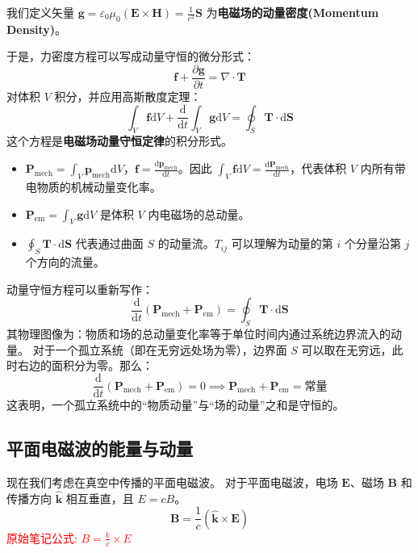 \documentclass[fontset=none]{ctexart}
\begin{document}
\begin{definition}[电磁场动量密度]
我们定义矢量 $\bm{g} = \varepsilon_0\mu_0(\bm{E} \times \bm{H}) = \frac{1}{c^2}\bm{S}$ 为\textbf{电磁场的动量密度(Momentum Density)}。
\end{definition}

于是，力密度方程可以写成动量守恒的微分形式：
\begin{equation}
    \bm{f} + \frac{\partial \bm{g}}{\partial t} = \nabla \cdot \mathbf{T}
\end{equation}
对体积 $V$ 积分，并应用高斯散度定理：
\begin{equation}
    \int_V \bm{f} \mathrm{d}V + \frac{\mathrm{d}}{\mathrm{d}t}\int_V \bm{g} \mathrm{d}V = \oint_S \mathbf{T} \cdot \mathrm{d}\bm{S}
\end{equation}
这个方程是\textbf{电磁场动量守恒定律}的积分形式。
\begin{itemize}
    \item $\bm{P}_{\text{mech}} = \int_V \bm{p}_{\text{mech}} \mathrm{d}V$，$\bm{f} = \frac{\mathrm{d}\bm{p}_{\text{mech}}}{\mathrm{d}t}$。因此 $\int_V \bm{f} \mathrm{d}V = \frac{\mathrm{d}\bm{P}_{\text{mech}}}{\mathrm{d}t}$，代表体积 $V$ 内所有带电物质的机械动量变化率。
    \item $\bm{P}_{\text{em}} = \int_V \bm{g} \mathrm{d}V$ 是体积 $V$ 内电磁场的总动量。
    \item $\oint_S \mathbf{T} \cdot \mathrm{d}\bm{S}$ 代表通过曲面 $S$ 的动量流。$T_{ij}$ 可以理解为动量的第 $i$ 个分量沿第 $j$ 个方向的流量。
\end{itemize}
动量守恒方程可以重新写作：
\begin{equation}
    \frac{\mathrm{d}}{\mathrm{d}t}(\bm{P}_{\text{mech}} + \bm{P}_{\text{em}}) = \oint_S \mathbf{T} \cdot \mathrm{d}\bm{S}
\end{equation}
其物理图像为：物质和场的总动量变化率等于单位时间内通过系统边界流入的动量。
对于一个孤立系统（即在无穷远处场为零），边界面 $S$ 可以取在无穷远，此时右边的面积分为零。那么：
\begin{equation}
    \frac{\mathrm{d}}{\mathrm{d}t}(\bm{P}_{\text{mech}} + \bm{P}_{\text{em}}) = 0 \implies \bm{P}_{\text{mech}} + \bm{P}_{\text{em}} = \text{常量}
\end{equation}
这表明，一个孤立系统中的“物质动量”与“场的动量”之和是守恒的。

\subsection{平面电磁波的能量与动量}
现在我们考虑在真空中传播的平面电磁波。
对于平面电磁波，电场 $\bm{E}$、磁场 $\bm{B}$ 和传播方向 $\hat{\bm{k}}$ 相互垂直，且 $E = cB$。
\begin{equation}
    \bm{B} = \frac{1}{c}(\hat{\bm{k}} \times \bm{E})
\end{equation}
\textcolor{red}{原始笔记公式: $B = \frac{k}{c} \times E$}
\end{document}
